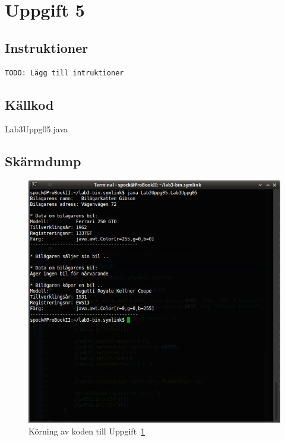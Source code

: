\section{Uppgift 5}\label{sec:uppg05}

\subsection{Instruktioner}
\begin{verbatim}
TODO: Lägg till intruktioner
\end{verbatim}


\subsection{Källkod}
\caption{Lab3Uppg05.java}
\label{src:uppg05}


\subsection{Skärmdump}
\begin{figure}[htbp]
    \centering
        \includegraphics[width=\linewidth]{img/05.png}
    \caption{Körning av koden till Uppgift~\ref{sec:uppg05}}
    \label{fig:uppg05-screenshot}
\end{figure}


